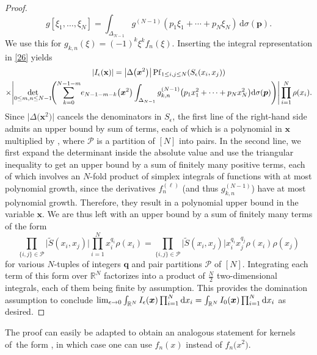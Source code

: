 \documentclass[pdftex]{sigma}
\numberwithin{equation}{section}
\newcommand{\dd}{\mathrm{d}}
\begin{document}
\begin{proof}
\[
g[\xi_1,\dots,\xi_N] = \int_{\Delta_{N - 1}} g^{(N - 1)}(p_1\xi_1 + \cdots + p_N\xi_N)\,\dd \sigma(\boldsymbol{p}).
\]
We use this for $g_{k,n}(\xi) = (-1)^{k}\xi^k f_n(\xi)$. Inserting the integral representation in \eqref{26} yields
\begin{gather*}
|I_{\epsilon}(\mathbf{x})| = \bigl|\Delta\bigl(\boldsymbol{x}^2\bigr)\bigr| \operatorname{Pf}_{1 \leq i,j \leq N}(S_{\epsilon}(x_i,x_j) ) \\
 \times \Biggl| \mathop{{\rm det}}_{0 \leq m,n \leq N - 1}\!\Biggl( \sum_{k = 0}^{N - 1 - m}\! e_{N - 1 - m - k}\bigl(\boldsymbol{x}^2\bigr) \int_{\Delta_{N - 1}} g_{k,n}^{(N - 1)}\bigl(p_1x_1^2 + \cdots + p_N x_N^2\bigr) \dd \sigma(\boldsymbol{p})\Biggr)\Biggr| \prod_{i = 1}^N \rho(x_i).
\end{gather*}
Since $\bigl|\Delta\bigl(\boldsymbol{x}^2\bigr)\bigr|$ cancels the denominators in $S_{\epsilon}$, the first line of the right-hand side admits an upper bound
by sum of terms, each of which is a polynomial in $\boldsymbol{x}$ multiplied by , where $\mathcal{P}$ is a partition of $[N]$ into pairs. In the second line, we first expand the determinant inside the absolute value and use the triangular inequality to get an upper bound by a sum of finitely many positive terms, each of which involves an $N$-fold product of simplex integrals of functions with at most polynomial growth, since the derivatives $f_{n}^{(\ell)}$ \big(and thus $g_{k,n}^{(N - 1)}$\big) have at most polynomial growth. Therefore, they result in a polynomial upper bound in the variable $\boldsymbol{x}$. We are thus left with an upper bound by a sum of finitely many terms of the form
\[
\prod_{\{i,j\} \in \mathcal{P}} \bigl|\tilde{S}(x_i,x_j)\bigr| \prod_{i = 1}^{N} x_i^{q_i}\rho(x_i) = \prod_{\{i,j\} \in \mathcal{P}} \bigl|\tilde{S}(x_i,x_j)\bigr|x_i^{q_i}x_j^{q_j} \rho(x_i)\rho(x_j)
\]
for various $N$-tuples of integers $\boldsymbol{q}$ and pair partitions $\mathcal{P}$ of $[N]$. Integrating each term of this form over $\mathbb{R}^{N}$ factorizes into a product of $\frac{N}{2}$ two-dimensional integrals, each of them being finite by assumption. This provides the domination assumption to conclude $\smash{\lim_{\epsilon \rightarrow 0} \int_{\mathbb{R}^N} I_{\epsilon}(\boldsymbol{x}) \prod_{i = 1}^N \dd x_i} = \smash{\int_{\mathbb{R}^N} I_0(\boldsymbol{x}) \prod_{i = 1}^N \dd x_i}$ as desired.
\end{proof}

\begin{Remark}
\label{therem} The proof can easily be adapted to obtain an analogous statement for kernels of~the form , in which case one can use $f_n(x)$ instead of $f_n\bigl(x^2\bigr)$.
\end{Remark}
\end{document}

